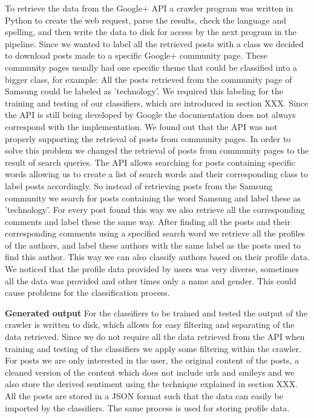 To retrieve the data from the Google+ API a crawler program was written in Python to create the web request, parse the results, check the language and spelling, and then write the data to disk for access by the next program in the pipeline. Since we wanted to label all the retrieved posts with a class we decided to download posts made to a specific Google+ community page. These community pages usually had one specific theme that could be classified into a bigger class, for example: All the posts retrieved from the community page of Samsung could be labeled as 'technology'. We required this labeling for the training and testing of our classifiers, which are introduced in section XXX.
Since the API is still being developed by Google the documentation does not always correspond with the implementation. We found out that the API was not properly supporting the retrieval of posts from community pages. In order to solve this problem we changed the retrieval of posts from community pages to the result of search queries. The API allows searching for posts containing specific words allowing us to create a list of search words and their corresponding class to label posts accordingly. So instead of retrieving posts from the Samsung community we search for posts containing the word Samsung and label these as 'technology'.
For every post found this way we also retrieve all the corresponding comments and label these the same way. After finding all the posts and their corresponding comments using a specified search word we retrieve all the profiles of the authors, and label these authors with the same label as the posts used to find this author. This way we can also classify authors based on their profile data. We noticed that the profile data provided by users was very diverse, sometimes all the data was provided and other times only a name and gender. This could cause problems for the classification process.

\textbf{Generated output}
For the classifiers to be trained and tested the output of the crawler is written to disk, which allows for easy filtering and separating of the data retrieved. Since we do not require all the data retrieved from the API when training and testing of the classifiers we apply some filtering within the crawler. For posts we are only interested in the user, the original content of the posts, a cleaned version of the content which does not include urls and smileys and we also store the derived sentiment using the technique explained in section XXX. All the posts are stored in a JSON format such that the data can easily be imported by the classifiers. The same process is used for storing profile data.
